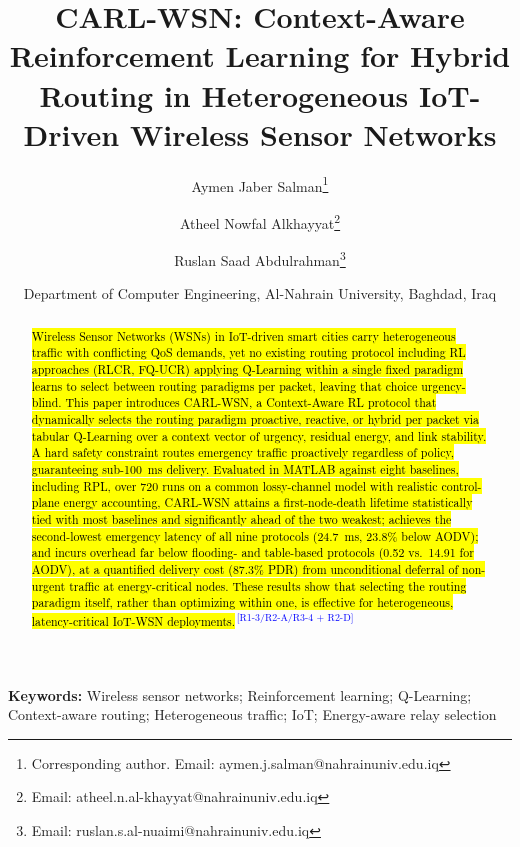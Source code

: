 \documentclass[12pt]{article}
\newcommand{\rtag}[1]{\textsuperscript{\textcolor{blue}{\scriptsize\,[#1]}}}
\newcommand{\hlx}[1]{{\exhyphenpenalty=10000\hyphenpenalty=10000\let\ \nobreakspace\hl{#1}}}
\begin{document}
\title{CARL-WSN: Context-Aware Reinforcement Learning for Hybrid Routing in Heterogeneous IoT-Driven Wireless Sensor Networks}

\author{
Aymen Jaber Salman\thanks{Corresponding author. Email: aymen.j.salman@nahrainuniv.edu.iq} \and
Atheel Nowfal Alkhayyat\thanks{Email: atheel.n.al-khayyat@nahrainuniv.edu.iq} \and
Ruslan Saad Abdulrahman\thanks{Email: ruslan.s.al-nuaimi@nahrainuniv.edu.iq}
}
\date{Department of Computer Engineering, Al-Nahrain University, Baghdad, Iraq}

\maketitle

\begin{abstract}
\hlx{Wireless Sensor Networks (WSNs) in IoT-driven smart cities carry heterogeneous
traffic with conflicting QoS demands, yet no existing routing
protocol \textemdash{} including RL approaches (RLCR, FQ-UCR) applying Q-Learning
within a single fixed paradigm \textemdash{} learns to select between routing
paradigms per packet, leaving that choice urgency-blind. This paper
introduces CARL-WSN, a Context-Aware RL protocol that dynamically
selects the routing paradigm \textemdash{} proactive, reactive, or hybrid \textemdash{} per
packet via tabular Q-Learning over a context vector of urgency,
residual energy, and link stability. A hard safety constraint routes
emergency traffic proactively regardless of policy, guaranteeing
sub-100~ms delivery. Evaluated in MATLAB against eight baselines,
including RPL, over 720 runs on a common lossy-channel model with
realistic control-plane energy accounting, CARL-WSN attains a
first-node-death lifetime statistically tied with most baselines and
significantly ahead of the two weakest; achieves the second-lowest
emergency latency of all nine protocols (24.7~ms, 23.8\% below AODV);
and incurs overhead far below flooding- and table-based protocols
(0.52 vs.~14.91 for AODV), at a quantified delivery cost (87.3\% PDR)
from unconditional deferral of non-urgent traffic at energy-critical
nodes. These results show that selecting the routing paradigm itself,
rather than optimizing within one, is effective for heterogeneous,
latency-critical IoT-WSN deployments.}\rtag{R1-3/R2-A/R3-4 + R2-D}
\end{abstract}

\vspace{0.5em}
\noindent\textbf{Keywords:} Wireless sensor networks; Reinforcement learning; Q-Learning; Context-aware routing; Heterogeneous traffic; IoT; Energy-aware relay selection
\vspace{1em}
\end{document}
